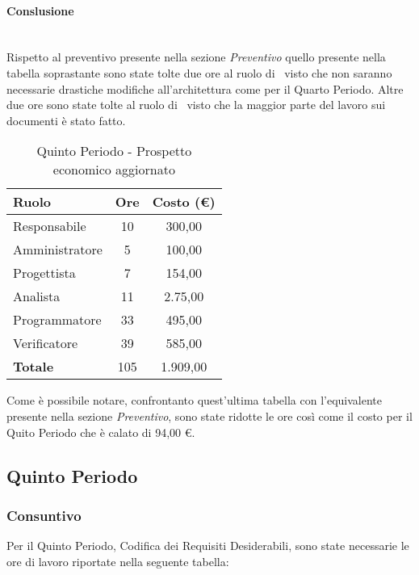 \documentclass[../PianoDiProgetto_v4.0.0.tex]{subfiles}
\begin{document}
		\paragraph{Conslusione} \mbox{} \\
		Rispetto al preventivo presente nella sezione \textit{Preventivo} quello presente nella tabella soprastante sono state tolte due ore al ruolo di \progettista\, visto che non saranno necessarie drastiche modifiche all'architettura come per il Quarto Periodo. Altre due ore sono state tolte al ruolo di \analista\ visto che la maggior parte del lavoro sui documenti è stato fatto.
		
		\begin{table}[h]
			\centering
			\begin{tabular}{l * {2}{c}}
			\toprule
			\textbf{Ruolo} & \textbf{Ore} & \textbf{Costo (\euro{})} \\
			\midrule
			Responsabile & 10 & 300,00 \\
			Amministratore & 5 & 100,00 \\
			Progettista & 7 & 154,00 \\
			Analista & 11 & 2.75,00 \\		
			Programmatore & 33 & 495,00 \\		
			Verificatore & 39 & 585,00 \\				
			\midrule		
			\textbf{Totale} & 105 & 1.909,00 \\
			\bottomrule	
			\end{tabular}
			\caption{Quinto Periodo - Prospetto economico aggiornato}	
		\end{table}
		
		Come è possibile notare, confrontanto quest'ultima tabella con l'equivalente presente nella sezione \textit{Preventivo}, sono state ridotte le ore così come il costo per il Quito Periodo che è calato di 94,00 \euro{}.
		
	\subsection{Quinto Periodo}
		\subsubsection{Consuntivo}
		Per il Quinto Periodo, Codifica dei Requisiti Desiderabili, sono state necessarie le ore di lavoro riportate nella seguente tabella:
		
\end{document}
